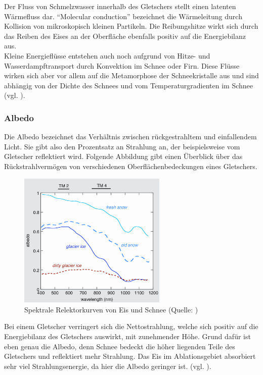 \documentclass[11pt,a4paper]{article}
\begin{document}
Der Fluss von Schmelzwasser innerhalb des Gletschers stellt einen latenten Wärmefluss dar. 
``Molecular conduction'' bezeichnet die Wärmeleitung durch Kollision von mikroskopisch kleinen Partikeln. Die Reibungshitze wirkt sich durch das Reiben des Eises an der Oberfläche ebenfalls positiv auf die Energiebilanz aus.\\
Kleine Energieflüsse entstehen auch noch aufgrund von Hitze- und Wasserdampftransport durch Konvektion im Schnee oder Firn. Diese Flüsse wirken sich aber vor allem auf die Metamorphose der Schneekristalle aus und sind abhängig von der Dichte des Schnees und vom Temperaturgradienten im Schnee (vgl. \cite[17]{Themicroclimateofvalleyglaciers}).


\subsubsection{Albedo}\label{Albedo}
Die Albedo bezeichnet das Verhältnis zwischen rückgestrahltem und einfallendem Licht. Sie gibt also den Prozentsatz an Strahlung an, der beispielsweise vom Gletscher reflektiert wird. Folgende Abbildung gibt einen Überblick über das Rückstrahlvermögen von verschiedenen Oberflächenbedeckungen eines Gletschers.

\begin{figure}[H]
\centering
\includegraphics[width=0.63\textwidth]{pictures/spectral_reflectance_curves_for_ice_and_snow.png}
\caption[Spektrale Relektorkurven von Eis und Schnee]{Spektrale Relektorkurven von Eis und Schnee (Quelle: \cite{Themicroclimateofvalleyglaciers})}
\label{fig:Spektrale Relektorkurven von Eis und Schnee}
\end{figure}

Bei einem Gletscher verringert sich die Nettostrahlung, welche sich positiv auf die Energiebilanz des Gletschers auswirkt, mit zunehmender Höhe. Grund dafür ist eben genau die Albedo, denn Schnee bedeckt die höher liegenden Teile des Gletschers und reflektiert mehr Strahlung. Das Eis im Ablationsgebiet absorbiert sehr viel Strahlungsenergie, da hier die Albedo geringer ist. (vgl. \cite[171]{ThePhysicsOfGlaciers}).
\end{document}
